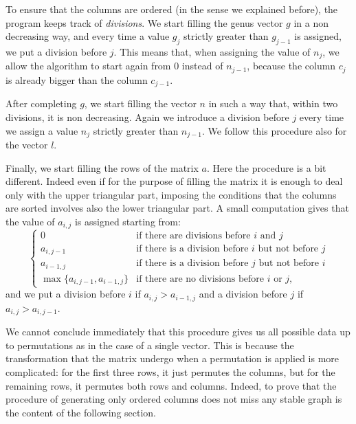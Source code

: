 \documentclass{amsart}
\theoremstyle{plain}
\theoremstyle{definition}
\begin{document}
To ensure that the columns are ordered (in the sense we explained
before), the program keeps track of \emph{divisions}. We start filling
the genus vector $g$ in a non decreasing way, and every time a value
$g_j$ strictly greater than $g_{j-1}$ is assigned, we put a division
before $j$.
This means that, when assigning the value of $n_j$, we allow
the algorithm to start again from $0$ instead of $n_{j-1}$, because the column
$c_j$ is already bigger than the column $c_{j-1}$.

After completing $g$, we start filling the vector $n$ in such a way
that, within two divisions, it is non decreasing. Again we introduce a
division before $j$ every time we assign a value $n_j$ strictly
greater than $n_{j-1}$. We follow this procedure also for the vector
$l$.

Finally, we start filling the rows of the matrix $a$. Here the
procedure is a bit different. Indeed even if for the purpose of filling
the matrix it is enough to deal only with the upper triangular part,
imposing the conditions that the columns are sorted involves also the
lower triangular part. A small computation gives that the value of
$a_{i,j}$ is assigned starting from:
\[
\begin{cases}
  0 & \text{if there are divisions before $i$ and $j$}\\
  a_{i,j-1} & \text{if there is a division before $i$ but not before
    $j$}\\
  a_{i-1,j} & \text{if there is a division before $j$ but not before
    $i$}\\
  \max\{a_{i,j-1}, a_{i-1,j}\} & \text{if there are no divisions
    before $i$ or $j$,}
\end{cases}
\]
and we put a division before $i$ if $a_{i,j} > a_{i-1,j}$ and a division
before $j$ if $a_{i,j} > a_{i,j-1}$.

We cannot conclude immediately that this procedure gives us all
possible data up to permutations as in the case of a single
vector. This is because the transformation that the matrix undergo
when a permutation is applied is more complicated: for the first three
rows, it just permutes the columns, but for the remaining rows, it
permutes both rows and columns. Indeed, to prove that the procedure of
generating only ordered columns does not miss any stable graph is the
content of the following section.
\end{document}
